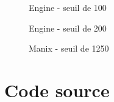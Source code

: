 \documentclass [a4 paper,11pt]{report}
\begin{document}
\begin{figure}[h!]
\noindent{}
\caption{Engine - seuil de 100}
\end{figure}

\begin{figure}[h!]
\noindent{}
\caption{Engine - seuil de 200}
\end{figure}

\begin{figure}[h!]
\noindent{}
\caption{Manix - seuil de 1250}
\end{figure}

\newpage
\section*{Code source}
\end{document}
